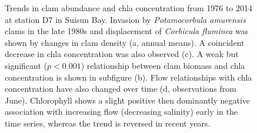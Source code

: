 \documentclass[letterpaper,12pt,oneside]{article}\usepackage[]{graphicx}\usepackage[]{color}
\begin{document}
\begin{figure}[!ht]
\caption{Trends in clam abundance and \ac{chla} concentration from 1976 to 2014 at station D7 in Suisun Bay.  Invasion by \textit{Potamocorbula amurensis} clams in the late 1980s and displacement of \textit{Corbicula fluminea} was shown by changes in clam density (a, annual means).  A coincident decrease in \ac{chla} concentration was also observed (c).  A weak but significant ($p < 0.001$) relationship between clam biomass and \ac{chla} concentration is shown in subfigure (b).  Flow relationships with \ac{chla} concentration have also changed over time (d, observations from June). Chlorophyll shows a slight positive then dominantly negative association with increasing flow (decreasing salinity) early in the time series, whereas the trend is reversed in recent years.}\label{fig:clmchl}
\end{figure}
\end{document}
